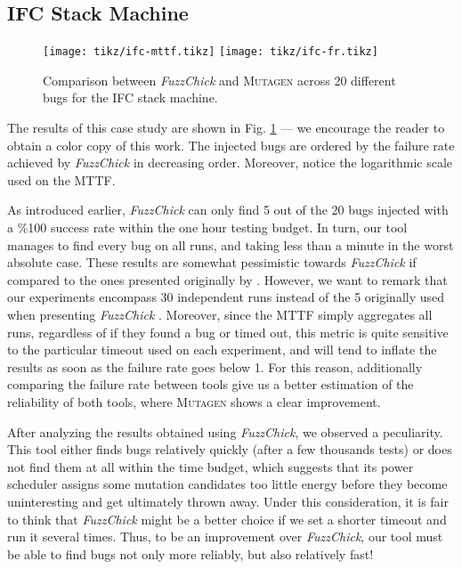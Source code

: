 \documentclass[sigconf, anonymous]{acmart}
\newcommand{\fuzzchick}{\textit{FuzzChick}\xspace}
\newcommand{\mutagen}{\textsc{Mutagen}\xspace}
\begin{document}
\subsection{IFC Stack Machine}

\begin{figure}[t]
  \centering
  \texttt{[image: tikz/ifc-mttf.tikz]}
  \texttt{[image: tikz/ifc-fr.tikz]}
  \vspace{-20pt}
  \caption{\label{fig:results:ifc} Comparison between \fuzzchick and \mutagen
    across 20 different bugs for the IFC stack machine. }
\vspace{-10pt}
\end{figure}


The results of this case study are shown in Fig. \ref{fig:results:ifc} --- we
encourage the reader to obtain a color copy of this work.
%
The injected bugs are ordered by the failure rate achieved by \fuzzchick in
decreasing order.
%
Moreover, notice the logarithmic scale used on the MTTF.

As introduced earlier, \fuzzchick can only find 5 out of the 20 bugs injected
with a \%100 success rate within the one hour testing budget.
%
In turn, our tool manages to find every bug on all runs, and taking less than a
minute in the worst absolute case.
%
These results are somewhat pessimistic towards \fuzzchick if compared to the
ones presented originally by \citeauthor{lampropoulos2019coverage}.
%
However, we want to remark that our experiments encompass 30 independent runs
instead of the 5 originally used when presenting \fuzzchick
\citeyearpar{lampropoulos2019coverage}.
%
Moreover, since the MTTF simply aggregates all runs, regardless of if they found
a bug or timed out, this metric is quite sensitive to the particular timeout
used on each experiment, and will tend to inflate the results as soon as the
failure rate goes below 1.
%
For this reason, additionally comparing the failure rate between tools give us a
better estimation of the reliability of both tools, where \mutagen shows a clear
improvement.

After analyzing the results obtained using \fuzzchick, we observed a
peculiarity.
%
This tool either finds bugs relatively quickly (after a few thousands tests) or
does not find them at all within the time budget, which suggests that its power
scheduler assigns some mutation candidates too little energy before they become
uninteresting and get ultimately thrown away.
%
Under this consideration, it is fair to think that \fuzzchick might be a better
choice if we set a shorter timeout and run it several times.
%
Thus, to be an improvement over \fuzzchick, our tool must be able to find bugs
not only more reliably, but also relatively fast!
\end{document}
